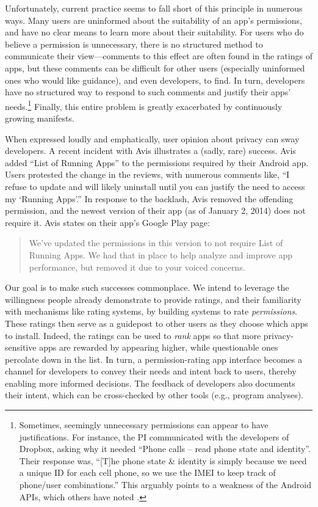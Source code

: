 \documentclass[11pt]{article}
\begin{document}
Unfortunately, current practice seems to fall short of this principle
in numerous ways.  Many users are uninformed about the suitability of
an app's permissions, and have no clear means to learn more about
their suitability. For users who do
believe a permission is unnecessary, there is no structured method to
communicate their view---comments to this effect are often found in
the ratings of apps, but these comments can be difficult for other
users (especially uninformed ones who would like guidance), and even
developers, to find. In turn, developers have no structured way to
respond to such comments and justify their apps'
needs.\footnote{Sometimes, seemingly unnecessary permissions can
  appear to have justifications. For instance, the PI communicated
  with the developers of Dropbox, asking why it needed ``Phone calls
  -- read phone state and identity''. Their response was, ``[T]he
  phone state \& identity is simply because we need a unique ID for
  each cell phone, so we use the IMEI to keep track of phone/user
  combinations.'' This arguably points to a weakness of the Android
  APIs, which others have noted \cite{effectivness-perms-USENIX11}.} Finally, this entire problem
is greatly exacerbated by continuously growing manifests.

When expressed loudly and emphatically, user opinion about privacy can
sway developers. A recent incident with Avis illustrates a (sadly,
rare) success. Avis added ``List of Running Apps'' to the permissions
required by their Android app. Users protested the change in the
reviews, with numerous comments like, ``I refuse to update and will
likely uninstall until you can justify the need to access my `Running
Apps'.'' In response to the backlash, Avis removed the offending
permission, and the newest version of their app (as of January 2,
2014) does not require it. Avis states on their app's Google Play
page:
\begin{quote}
  We've updated the permissions in this version to not require List of
  Running Apps. We had that in place to help analyze and improve app
  performance, but removed it due to your voiced concerns.
\end{quote}

Our goal is to make such successes commonplace. We intend to leverage
the willingness people already demonstrate to provide ratings, and
their familiarity with mechanisms like rating systems, by building systems to rate
\emph{permissions}. These ratings then serve as a guidepost to other
users as they choose which apps to install. 
Indeed, the ratings can be used to \emph{rank} apps
so that more privacy-sensitive apps are rewarded by appearing higher,
while questionable ones percolate down in the list. In turn, a
permission-rating app interface becomes a channel for developers to
convey their needs and intent back to users, thereby enabling more
informed decisions. The feedback of developers also documents their
intent, which can be cross-checked by other tools (e.g., program
analyses).
\end{document}
